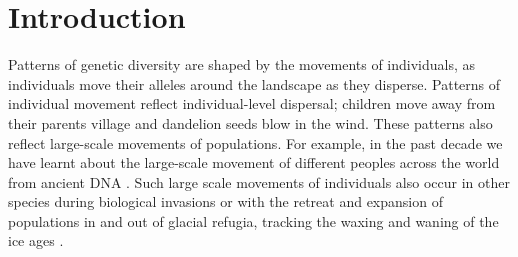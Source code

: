 \documentclass[12pt]{article}
\begin{document}
%

\section*{Introduction}

Patterns of genetic diversity are shaped by the movements of individuals, as individuals move their alleles around the landscape as they disperse. Patterns of individual movement reflect individual-level dispersal; children move away from their parents village and dandelion seeds blow in the wind. These patterns also reflect large-scale movements of populations. 
For example, in the past decade we have learnt about the large-scale movement of different peoples across the world from ancient DNA \citep{slatkin2016ancient,reich2018we}. 
Such large scale movements of individuals also occur in other species during biological invasions or with the retreat and expansion of populations in and out of glacial refugia, tracking the waxing and waning of the ice ages \citep{hewitt2000genetic}.
\end{document}
